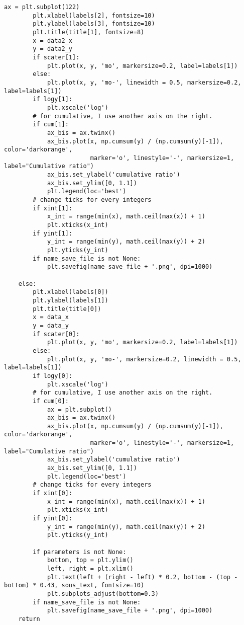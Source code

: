\begin{Verbatim}[fontsize=\tiny]
        ax = plt.subplot(122)
        plt.xlabel(labels[2], fontsize=10)
        plt.ylabel(labels[3], fontsize=10)
        plt.title(title[1], fontsize=8)
        x = data2_x
        y = data2_y
        if scater[1]:
            plt.plot(x, y, 'mo', markersize=0.2, label=labels[1])
        else:
            plt.plot(x, y, 'mo-', linewidth = 0.5, markersize=0.2, label=labels[1])
        if logy[1]:
            plt.xscale('log')
        # for cumulative, I use another axis on the right.
        if cum[1]:
            ax_bis = ax.twinx()
            ax_bis.plot(x, np.cumsum(y) / (np.cumsum(y)[-1]), color='darkorange',
                        marker='o', linestyle='-', markersize=1, label="Cumulative ratio")
            ax_bis.set_ylabel('cumulative ratio')
            ax_bis.set_ylim([0, 1.1])
            plt.legend(loc='best')
        # change ticks for every integers
        if xint[1]:
            x_int = range(min(x), math.ceil(max(x)) + 1)
            plt.xticks(x_int)
        if yint[1]:
            y_int = range(min(y), math.ceil(max(y)) + 2)
            plt.yticks(y_int)
        if name_save_file is not None:
            plt.savefig(name_save_file + '.png', dpi=1000)

    else:
        plt.xlabel(labels[0])
        plt.ylabel(labels[1])
        plt.title(title[0])
        x = data_x
        y = data_y
        if scater[0]:
            plt.plot(x, y, 'mo', markersize=0.2, label=labels[1])
        else:
            plt.plot(x, y, 'mo-', markersize=0.2, linewidth = 0.5, label=labels[1])
        if logy[0]:
            plt.xscale('log')
        # for cumulative, I use another axis on the right.
        if cum[0]:
            ax = plt.subplot()
            ax_bis = ax.twinx()
            ax_bis.plot(x, np.cumsum(y) / (np.cumsum(y)[-1]), color='darkorange',
                        marker='o', linestyle='-', markersize=1, label="Cumulative ratio")
            ax_bis.set_ylabel('cumulative ratio')
            ax_bis.set_ylim([0, 1.1])
            plt.legend(loc='best')
        # change ticks for every integers
        if xint[0]:
            x_int = range(min(x), math.ceil(max(x)) + 1)
            plt.xticks(x_int)
        if yint[0]:
            y_int = range(min(y), math.ceil(max(y)) + 2)
            plt.yticks(y_int)

        if parameters is not None:
            bottom, top = plt.ylim()
            left, right = plt.xlim()
            plt.text(left + (right - left) * 0.2, bottom - (top - bottom) * 0.43, sous_text, fontsize=10)
            plt.subplots_adjust(bottom=0.3)
        if name_save_file is not None:
            plt.savefig(name_save_file + '.png', dpi=1000)
    return



\end{Verbatim}
